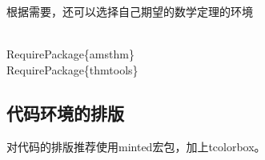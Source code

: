 \documentclass{hnuthesis}%
\begin{document}
根据需要，还可以选择自己期望的数学定理的环境

\begin{nowebtrunk}
\nwenddocs{}\endmoddef\nwstartdeflinemarkup\nwenddeflinemarkup
\\RequirePackage\{amsthm\}
\\RequirePackage\{thmtools\}
\nwendcode{}\end{nowebtrunk}


\subsection{代码环境的排版}

对代码的排版推荐使用minted宏包，加上tcolorbox。
\end{document}
